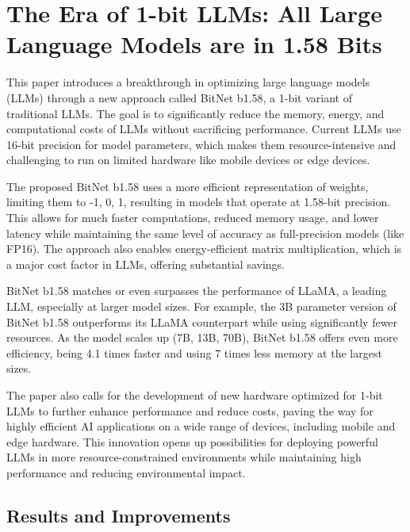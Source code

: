 \documentclass{report}
\begin{document}
	
	
	
	
	
	
	
	\chapter{The Era of 1-bit LLMs: All Large Language Models are in 1.58 Bits \cite{ma2024era1bitllmslarge}}
	
	This paper introduces a breakthrough in optimizing large language models (LLMs) through a new approach called BitNet b1.58, a 1-bit variant of traditional LLMs. The goal is to significantly reduce the memory, energy, and computational costs of LLMs without sacrificing performance. Current LLMs use 16-bit precision for model parameters, which makes them resource-intensive and challenging to run on limited hardware like mobile devices or edge devices.
	
	
	The proposed BitNet b1.58 uses a more efficient representation of weights, limiting them to {-1, 0, 1}, resulting in models that operate at 1.58-bit precision. This allows for much faster computations, reduced memory usage, and lower latency while maintaining the same level of accuracy as full-precision models (like FP16). The approach also enables energy-efficient matrix multiplication, which is a major cost factor in LLMs, offering substantial savings.
	
	
	BitNet b1.58 matches or even surpasses the performance of LLaMA, a leading LLM, especially at larger model sizes. For example, the 3B parameter version of BitNet b1.58 outperforms its LLaMA counterpart while using significantly fewer resources. As the model scales up (7B, 13B, 70B), BitNet b1.58 offers even more efficiency, being 4.1 times faster and using 7 times less memory at the largest sizes.
	
	
	The paper also calls for the development of new hardware optimized for 1-bit LLMs to further enhance performance and reduce costs, paving the way for highly efficient AI applications on a wide range of devices, including mobile and edge hardware. This innovation opens up possibilities for deploying powerful LLMs in more resource-constrained environments while maintaining high performance and reducing environmental impact.
	
	\section{Results and Improvements}
\end{document}
